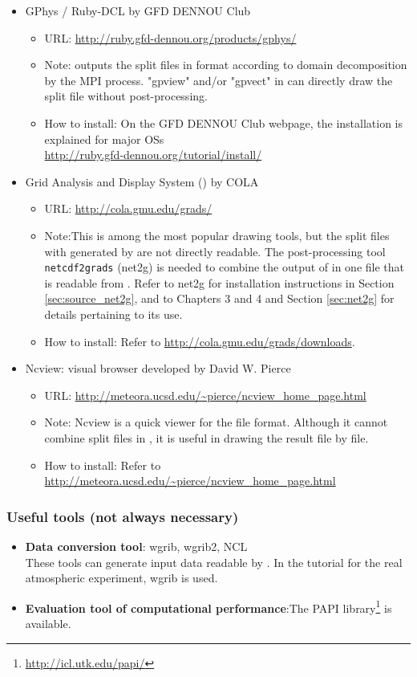 \begin{itemize}
\item GPhys / Ruby-DCL by GFD DENNOU Club
 \begin{itemize}
  \item URL: \url{http://ruby.gfd-dennou.org/products/gphys/}
  \item Note: \scalelib outputs the split files
  in {\netcdf} format according to domain decomposition by the MPI process.
  "gpview" and/or "gpvect" in {\gphys} can directly draw the split file without post-processing.
  \item How to install:
  On the GFD DENNOU Club webpage, the installation is explained for major OSs\\
  \url{http://ruby.gfd-dennou.org/tutorial/install/}\\
   \end{itemize}
\item Grid Analysis and Display System (\grads) by COLA
 \begin{itemize}
  \item URL: \url{http://cola.gmu.edu/grads/}
  \item Note:This is among the most popular drawing tools,
  but the split files with {\netcdf} generated by \scalelib are not directly readable.
  The post-processing tool \verb|netcdf2grads| (net2g) is needed to combine the output of \scalelib in one file that is readable from \grads. Refer to net2g for installation instructions in Section \ref{sec:source_net2g}, and to Chapters 3 and 4 and Section \ref{sec:net2g} for details pertaining to its use.
  \item How to install: Refer to \url{http://cola.gmu.edu/grads/downloads}.
 \end{itemize}
\item Ncview: {\netcdf} visual browser developed by David W. Pierce
 \begin{itemize}
  \item URL: \url{http://meteora.ucsd.edu/~pierce/ncview_home_page.html}
  \item Note: Ncview is a quick viewer for the {\netcdf} file format.
  Although it cannot combine split files in \scalelib, it is useful in drawing the result file by file.
  \item How to install: Refer to \url{http://meteora.ucsd.edu/~pierce/ncview_home_page.html}
 \end{itemize}
\end{itemize}


\subsubsection{Useful tools (not always necessary)}
\begin{itemize}
  \item {\bf Data conversion tool}: wgrib, wgrib2, NCL\\
  These tools can generate input data readable by \scalerm.
  In the tutorial for the real atmospheric experiment, wgrib is used.
  \item {\bf Evaluation tool of computational performance}:The PAPI library\footnote{\url{http://icl.utk.edu/papi/}} is available.
\end{itemize}
